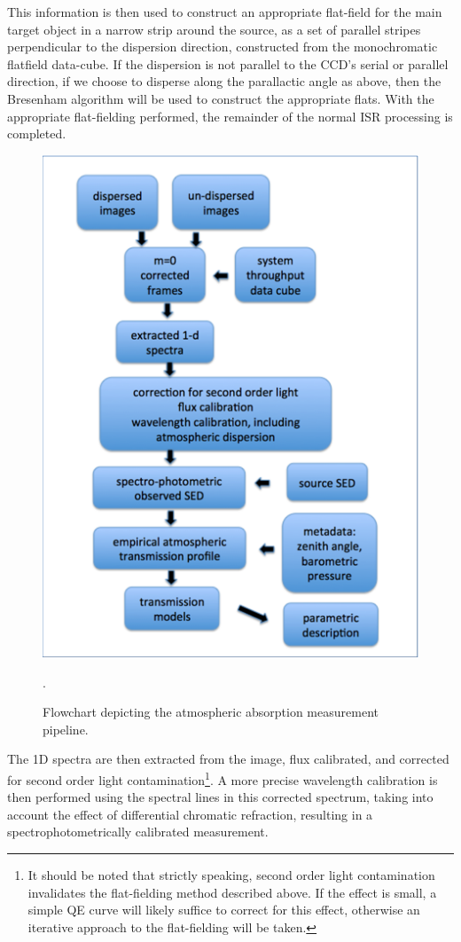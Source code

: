 This information is then used to construct an appropriate flat-field for the main target object  in a narrow strip around the source, as a set of parallel stripes perpendicular to the dispersion direction, constructed from the monochromatic flatfield data-cube. If the dispersion is not parallel to the CCD's serial or parallel direction, \ie if we choose to disperse along the parallactic angle as above, then the Bresenham algorithm will be used to construct the appropriate flats. With the appropriate flat-fielding performed, the remainder of the normal ISR processing is completed.

\begin{figure}
	\centering
	\includegraphics[width=\textwidth]{figures/aux_telescope_workflow.png}
	\caption{Flowchart depicting the atmospheric absorption measurement pipeline.}.
	\label{fig:aux_telescope}
\end{figure}

The 1D spectra are then extracted from the image, flux calibrated, and corrected for second order light contamination\footnote{ It should be noted that strictly speaking, second order light contamination invalidates the flat-fielding method described above. If the effect is small, a simple QE curve will likely suffice to correct for this effect, otherwise an iterative approach to the flat-fielding will be taken.}. A more precise wavelength calibration is then performed using the spectral lines in this corrected spectrum, taking into account the effect of differential chromatic refraction, resulting in a spectrophotometrically calibrated measurement.

